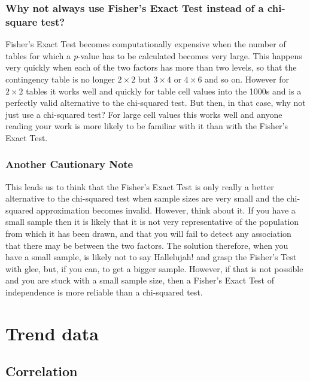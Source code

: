 \documentclass[
  letterpaper,
  DIV=11,
  numbers=noendperiod]{scrreprt}
\begin{document}
\section{Why not always use Fisher's Exact Test instead of a chi-square
test?}\label{why-not-always-use-fishers-exact-test-instead-of-a-chi-square-test}

Fisher's Exact Test becomes computationally expensive when the number of
tables for which a \emph{p}-value has to be calculated becomes very
large. This happens very quickly when each of the two factors has more
than two levels, so that the contingency table is no longer
\(2 \times 2\) but \(3 \times 4\) or \(4\times 6\) and so on. However
for \(2 \times 2\) tables it works well and quickly for table cell
values into the 1000s and is a perfectly valid alternative to the
chi-squared test. But then, in that case, why not just use a chi-squared
test? For large cell values this works well and anyone reading your work
is more likely to be familiar with it than with the Fisher's Exact Test.

\section{Another Cautionary Note}\label{another-cautionary-note}

This leads us to think that the Fisher's Exact Test is only really a
better alternative to the chi-squared test when sample sizes are very
small and the chi-squared approximation becomes invalid. However, think
about it. If you have a small sample then it is likely that it is not
very representative of the population from which it has been drawn, and
that you will fail to detect any association that there may be between
the two factors. The solution therefore, when you have a small sample,
is likely not to say Hallelujah! and grasp the Fisher's Test with glee,
but, if you can, to get a bigger sample. However, if that is not
possible and you are stuck with a small sample size, then a Fisher's
Exact Test of independence is more reliable than a chi-squared test.

\part{Trend data}

\chapter{Correlation}\label{correlation}
\end{document}
